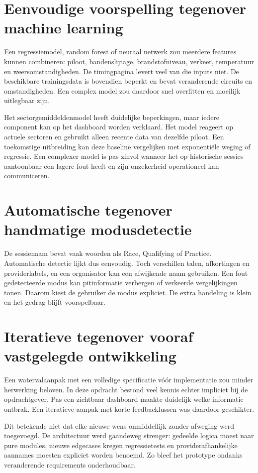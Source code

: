 \section{Eenvoudige voorspelling tegenover machine learning}
Een regressiemodel, random forest of neuraal netwerk zou meerdere features kunnen combineren:
piloot, bandenslijtage, brandstofniveau, verkeer, temperatuur en weersomstandigheden. De
timingpagina levert veel van die inputs niet. De beschikbare trainingsdata is bovendien beperkt en
bevat veranderende circuits en omstandigheden. Een complex model zou daardoor snel overfitten en
moeilijk uitlegbaar zijn.

Het sectorgemiddeldenmodel heeft duidelijke beperkingen, maar iedere component kan op het dashboard
worden verklaard. Het model reageert op actuele sectoren en gebruikt alleen recente data van
dezelfde piloot. Een toekomstige uitbreiding kan deze baseline vergelijken met exponentiële weging
of regressie. Een complexer model is pas zinvol wanneer het op historische sessies aantoonbaar een
lagere fout heeft en zijn onzekerheid operationeel kan communiceren.

\section{Automatische tegenover handmatige modusdetectie}
De sessienaam bevat vaak woorden als Race, Qualifying of Practice. Automatische detectie lijkt dus
eenvoudig. Toch verschillen talen, afkortingen en providerlabels, en een organisator kan een
afwijkende naam gebruiken. Een fout gedetecteerde modus kan pitinformatie verbergen of verkeerde
vergelijkingen tonen. Daarom kiest de gebruiker de modus expliciet. De extra handeling is klein en
het gedrag blijft voorspelbaar.

\section{Iteratieve tegenover vooraf vastgelegde ontwikkeling}
Een watervalaanpak met een volledige specificatie vóór implementatie zou minder herwerking beloven.
In deze opdracht bestond veel kennis echter impliciet bij de opdrachtgever. Pas een zichtbaar
dashboard maakte duidelijk welke informatie ontbrak. Een iteratieve aanpak met korte feedbacklussen
was daardoor geschikter.

Dit betekende niet dat elke nieuwe wens onmiddellijk zonder afweging werd toegevoegd. De
architectuur werd gaandeweg strenger: gedeelde logica moest naar pure modules, nieuwe edgecases
kregen regressietests en providerafhankelijke aannames moesten expliciet worden benoemd. Zo bleef
het prototype ondanks veranderende requirements onderhoudbaar.
